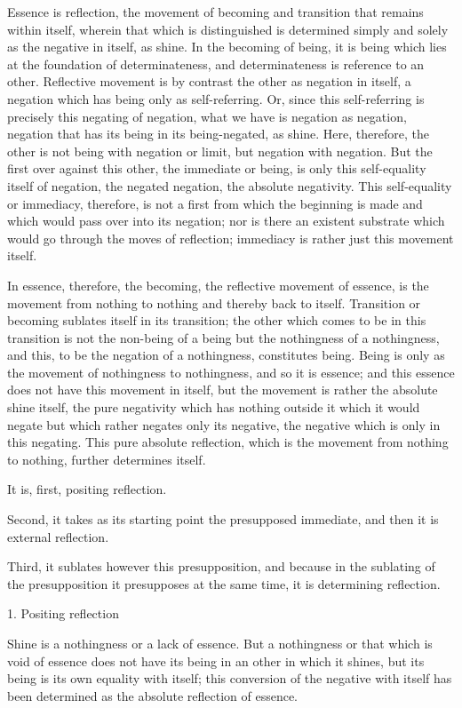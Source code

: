 Essence is reflection, the movement of
becoming and transition that remains within itself,
wherein that which is distinguished is determined
simply and solely as the negative in itself, as shine.
In the becoming of being, it is being which lies
at the foundation of determinateness,
and determinateness is reference to an other.
Reflective movement is by contrast
the other as negation in itself,
a negation which has being only as self-referring.
Or, since this self-referring is precisely this negating of negation,
what we have is negation as negation,
negation that has its being in its being-negated, as shine.
Here, therefore, the other is not being with negation or limit,
but negation with negation.
But the first over against this other, the immediate or being,
is only this self-equality itself of negation,
the negated negation, the absolute negativity.
This self-equality or immediacy, therefore, is
not a first from which the beginning is made
and which would pass over into its negation;
nor is there an existent substrate which would
go through the moves of reflection;
immediacy is rather just this movement itself.

In essence, therefore, the becoming,
the reflective movement of essence,
is the movement from nothing to nothing
and thereby back to itself.
Transition or becoming sublates itself in its transition;
the other which comes to be in this transition is
not the non-being of a being but the nothingness of a nothingness,
and this, to be the negation of a nothingness, constitutes being.
Being is only as the movement of nothingness to nothingness,
and so it is essence;
and this essence does not have this movement in itself,
but the movement is rather the absolute shine itself,
the pure negativity which has nothing outside it
which it would negate but which rather negates only its negative,
the negative which is only in this negating.
This pure absolute reflection, which is the movement
from nothing to nothing, further determines itself.

It is, first, positing reflection.

Second, it takes as its starting point
the presupposed immediate,
and then it is external reflection.

Third, it sublates however this presupposition,
and because in the sublating of the presupposition
it presupposes at the same time,
it is determining reflection.

1. Positing reflection

Shine is a nothingness or a lack of essence.
But a nothingness or that which is void of essence
does not have its being in an other in which it shines,
but its being is its own equality with itself;
this conversion of the negative with itself has been determined
as the absolute reflection of essence.

